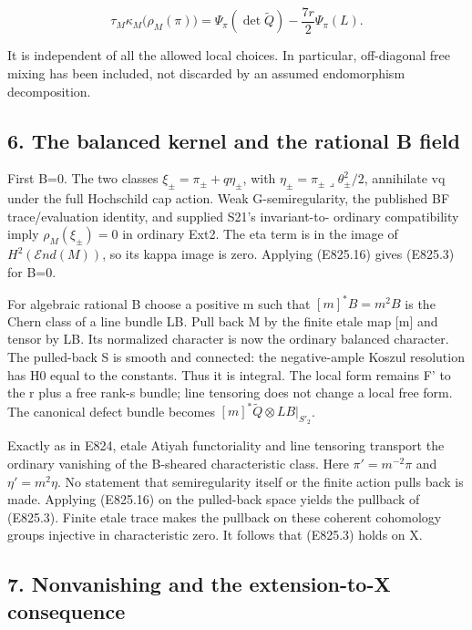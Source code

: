 \[
 \tau_M\kappa_M\bigl(\rho_M(\pi)\bigr)
   =\Psi_\pi(\det\widetilde Q)-\frac{7r}{2}\Psi_\pi(L).
 \tag{E825.16}
\]

It is independent of all the allowed local choices. In particular,
off-diagonal free mixing has been included, not discarded by an assumed
endomorphism decomposition.

\subsection{6. The balanced kernel and the rational B
field}\label{SF-E825:the-balanced-kernel-and-the-rational-b-field}

First B=0. The two classes \(\xi_\pm=\pi_\pm+q\eta_\pm\), with
\(\eta_\pm=\pi_\pm\mathbin\lrcorner\theta_\pm^2/2\), annihilate vq under
the full Hochschild cap action. Weak G-semiregularity, the published BF
trace/evaluation identity, and supplied S21's invariant-to- ordinary
compatibility imply \(\rho_M(\xi_\pm)=0\) in ordinary Ext2. The eta term
is in the image of \(H^2(\mathcal E nd(M))\), so its kappa image is
zero. Applying (E825.16) gives (E825.3) for B=0.

For algebraic rational B choose a positive m such that \([m]^*B=m^2B\)
is the Chern class of a line bundle LB. Pull back M by the finite etale
map {[}m{]} and tensor by LB. Its normalized character is now the
ordinary balanced character. The pulled-back S is smooth and connected:
the negative-ample Koszul resolution has H0 equal to the constants. Thus
it is integral. The local form remains F' to the r plus a free rank-s
bundle; line tensoring does not change a local free form. The canonical
defect bundle becomes \([m]^*\widetilde Q\otimes LB|_{S'_2}\).

Exactly as in E824, etale Atiyah functoriality and line tensoring
transport the ordinary vanishing of the B-sheared characteristic class.
Here \(\pi' =m^{-2}\pi\) and \(\eta'=m^2\eta\). No statement that
semiregularity itself or the finite action pulls back is made. Applying
(E825.16) on the pulled-back space yields the pullback of (E825.3).
Finite etale trace makes the pullback on these coherent cohomology
groups injective in characteristic zero. It follows that (E825.3) holds
on X.

\subsection{7. Nonvanishing and the extension-to-X
consequence}\label{SF-E825:nonvanishing-and-the-extension-to-x-consequence}


